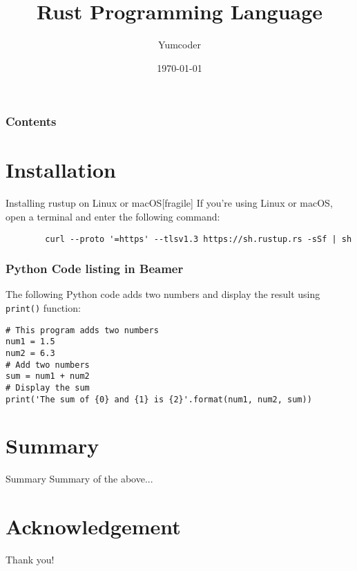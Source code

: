 \documentclass{beamer}
\title[Rust-Lang]{Rust Programming Language}
\author[Yumcoder]{Yumcoder}
\institute[UoT]{University of Toronto}
\date[{\today} ]
{\today}
\begin{document}
\frame{\titlepage}
\begin{frame}
\frametitle{Contents}
\tableofcontents
\end{frame}
\section{Installation}
\begin{frame}{Installing rustup on Linux or macOS}[fragile]
	If you’re using Linux or macOS, open a terminal and enter the following command:
	\begin{verbatim}
		curl --proto '=https' --tlsv1.3 https://sh.rustup.rs -sSf | sh
	\end{verbatim}
\end{frame}

\begin{frame}[fragile]
	\frametitle{Python Code listing in Beamer}
	The following Python code adds two numbers and display the result using \verb|print()| function:
	\scriptsize
	\begin{verbatim}
# This program adds two numbers
num1 = 1.5
num2 = 6.3
# Add two numbers
sum = num1 + num2
# Display the sum
print('The sum of {0} and {1} is {2}'.format(num1, num2, sum))
	\end{verbatim}
\end{frame}

\section{Summary}

\begin{frame}{Summary}
Summary of the above...
\end{frame}

\section*{Acknowledgement}  
\begin{frame}
\Huge{\centerline{Thank you!}}
\end{frame}
\end{document}
